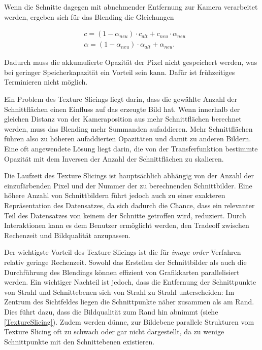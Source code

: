 \documentclass[a4paper,fontsize=12pt,toc=bib,parskip=half,ngerman]{scrartcl}
\begin{document}
Wenn die Schnitte dagegen mit abnehmender Entfernung zur Kamera verarbeitet werden, ergeben sich f\"ur das Blending die Gleichungen

\begin{align}
&c = (1-\alpha_{neu})\cdot c_{alt}+c_{neu}\cdot\alpha_{neu}
\label{back-to-front-color}\\ 
&\alpha = (1-\alpha_{neu})\cdot\alpha_{alt} + \alpha_{neu}.
\label{back-to-front-alpha}
\end{align}

Dadurch muss die akkumulierte Opazit\"at der Pixel nicht gespeichert werden, was bei geringer Speicherkapazit\"at ein Vorteil sein kann. Daf\"ur ist fr\"uhzeitiges Terminieren nicht m\"oglich.

Ein Problem des Texture Slicings liegt darin, dass die gew\"ahlte Anzahl der Schnittfl\"achen einen Einfluss auf das erzeugte Bild hat. Wenn innerhalb der gleichen Distanz von der Kameraposition aus mehr Schnittfl\"achen berechnet werden, muss das Blending mehr Summanden aufaddieren. Mehr Schnittfl\"achen f\"uhren also zu h\"oheren aufaddierten Opazit\"aten und damit zu anderen Bildern. Eine oft angewendete L\"osung liegt darin, die von der Transferfunktion bestimmte Opazit\"at mit dem Inversen der Anzahl der Schnittfl\"achen zu skalieren.

Die Laufzeit des Texture Slicings ist haupts\"achlich abh\"angig von der Anzahl der einzuf\"arbenden Pixel und der Nummer der zu berechnenden Schnittbilder. Eine h\"ohere Anzahl von Schnittbildern f\"uhrt jedoch auch zu einer exakteren Repr\"asentation des Datensatzes, da sich dadurch die Chance, dass ein relevanter Teil des Datensatzes von keinem der Schnitte getroffen wird, reduziert. Durch Interaktionen kann es dem Benutzer erm\"oglicht werden, den Tradeoff zwischen Rechenzeit und Bildqualit\"at anzupassen.

Der wichtigste Vorteil des Texture Slicings ist die f\"ur \textit{image-order} Verfahren relativ geringe Rechenzeit. Sowohl das Erstellen der Schnittbilder als auch die Durchf\"uhrung des Blendings k\"onnen effizient von Grafikkarten parallelisiert werden. Ein wichtiger Nachteil ist jedoch, dass die Entfernung der Schnittpunkte von Strahl und Schnittebenen sich von Strahl zu Strahl unterscheiden: Im Zentrum des Sichtfeldes liegen die Schnittpunkte n\"aher zusammen als am Rand. Dies f\"uhrt dazu, dass die Bildqualit\"at zum Rand hin abnimmt (siehe \cref{TextureSlicing}). Zudem werden d\"unne, zur Bildebene parallele Strukturen vom Texture Slicing oft zu schwach oder gar nicht dargestellt, da zu wenige Schnittpunkte mit den Schnittebenen existieren.
\end{document}
